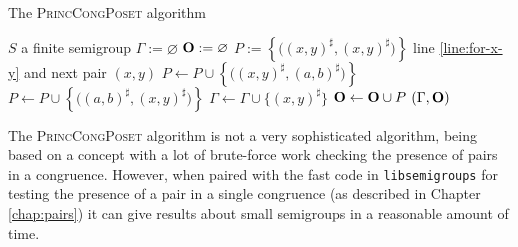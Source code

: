 \begin{algorithm}
  \caption{The \textsc{PrincCongPoset} algorithm}
  \label{alg:princ-cong-poset}
  \begin{algorithmic}[1]
    \Require $S$ a finite semigroup
      \State $\Gamma := \varnothing$
      \State $\mathbf{O} := \varnothing$
       \label{line:for-x-y}
        \State $P := \left\{\big((x,y)^\sharp, (x,y)^\sharp\big)\right\}$
              \State \Goto line \ref{line:for-x-y} and next pair $(x,y)$
            \Else
              \State $P \gets P \cup
                \left\{\big((x,y)^\sharp, (a,b)^\sharp\big)\right\}$
            \EndIf
              \State $P \gets P \cup
                \left\{\big((a,b)^\sharp, (x,y)^\sharp\big)\right\}$
          \EndIf
        \EndFor
        \State $\Gamma \gets \Gamma \cup \{(x,y)^\sharp\}$
        \State $\mathbf{O} \gets \mathbf{O} \cup P$
      \EndFor
      \State \Return $(\Gamma, \mathbf{O})$
    \EndProcedure
  \end{algorithmic}
\end{algorithm}

The \textsc{PrincCongPoset} algorithm is not a very sophisticated algorithm,
being based on a concept with a lot of brute-force work checking the presence of
pairs in a congruence.  However, when paired with the fast code in
\texttt{libsemigroups} \cite{libsemigroups} for testing the presence of a pair
in a single congruence (as described in Chapter \ref{chap:pairs}) it can give
results about small semigroups in a reasonable amount of time.

